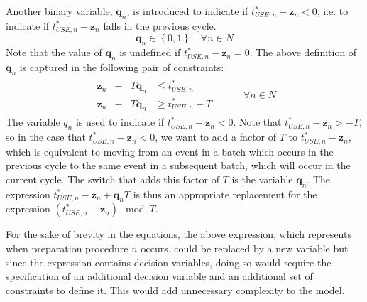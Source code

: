 Another binary variable, $ \boldsymbol{q}_{n} $, is introduced to indicate if
$ t_{\mathit{USE},n}^{*} - \boldsymbol{z}_{n} < 0 $, i.e. to indicate if 
$ t_{\mathit{USE},n}^{*} - \boldsymbol{z}_{n}$ falls in the previous cycle.
\begin{equation}
    \boldsymbol{q}_{n} \in \left\{ 0, 1 \right\} \quad \forall n \in N
    \label{eq.q}
\end{equation}
Note that the value of $ \boldsymbol{q}_{n} $ is undefined if
$ t_{\mathit{USE},n}^{*} - \boldsymbol{z}_{n} = 0 $.
The above definition of $ \boldsymbol{q}_{n} $ is captured in the following
pair of constraints:
\begin{equation}
    \begin{split}
        \begin{alignedat}{2}
            \boldsymbol{z}_{n} & {}-{} & T \boldsymbol{q}_{n} & \le
            t_{\mathit{USE},n}^{*}\\
            \boldsymbol{z}_{n} & {}-{} & T \boldsymbol{q}_{n} & \ge
            t_{\mathit{USE},n}^{*} - T
        \end{alignedat}
    \end{split}
    \quad\quad
    \begin{split}
        \forall n \in N
    \end{split}
    \label{eq.constr8a}
\end{equation}
The variable $q_{n}$ is used to indicate if
$t_{\mathit{USE},n}^{*} - \boldsymbol{z}_{n} < 0$.
Note that $t_{\mathit{USE},n}^{*} - \boldsymbol{z}_{n} > -T$, so in the
case that $t_{\mathit{USE},n}^{*} - \boldsymbol{z}_{n} < 0 $, we want to add a
factor of $T$ to $t_{\mathit{USE},n}^{*} - \boldsymbol{z}_{n}$, which is
equivalent to moving from an event in a batch which occurs in the previous
cycle to the same event in a subsequent batch, which will occur in the current
cycle.
The switch that adds this factor of $T$ is the variable
$\boldsymbol{q}_{n}$.
The expression 
$t_{\mathit{USE},n}^{*} - \boldsymbol{z}_{n} + \boldsymbol{q}_{n} T$
is thus an appropriate replacement for the expression
$\left( t_{\mathit{USE},n}^{*} - \boldsymbol{z}_{n} \right) \mod T$.

For the sake of brevity in the equations, the above expression, which
represents when preparation procedure $n$ occurs, could be replaced by a new
variable but since the expression contains decision variables, doing so would
require the specification of an additional decision variable and an additional
set of constraints to define it.
This would add unnecessary complexity to the model.


